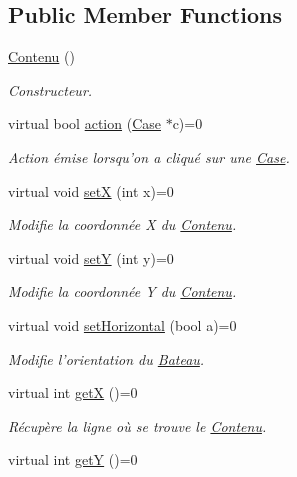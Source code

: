 \subsection*{Public Member Functions}
\begin{DoxyCompactItemize}
\item 
\hyperlink{classContenu_ac20817eae49d031383e9a3be58c2bf15}{Contenu} ()
\begin{DoxyCompactList}\small\item\em Constructeur. \end{DoxyCompactList}\item 
virtual bool \hyperlink{classContenu_ae54145207bfdae5a24ce2c8c523c74a0}{action} (\hyperlink{classCase}{Case} $\ast$c)=0
\begin{DoxyCompactList}\small\item\em Action émise lorsqu'on a cliqué sur une \hyperlink{classCase}{Case}. \end{DoxyCompactList}\item 
virtual void \hyperlink{classContenu_a801fc9cb327750d2889ab3e7b185c029}{set\+X} (int x)=0
\begin{DoxyCompactList}\small\item\em Modifie la coordonnée X du \hyperlink{classContenu}{Contenu}. \end{DoxyCompactList}\item 
virtual void \hyperlink{classContenu_afc6fc6f669313fe77ca57559475d1750}{set\+Y} (int y)=0
\begin{DoxyCompactList}\small\item\em Modifie la coordonnée Y du \hyperlink{classContenu}{Contenu}. \end{DoxyCompactList}\item 
virtual void \hyperlink{classContenu_ad06f3204769fdc758a5859fbb7cac637}{set\+Horizontal} (bool a)=0
\begin{DoxyCompactList}\small\item\em Modifie l'orientation du \hyperlink{classBateau}{Bateau}. \end{DoxyCompactList}\item 
virtual int \hyperlink{classContenu_afce83627ee635c60edb0edced8191af4}{get\+X} ()=0
\begin{DoxyCompactList}\small\item\em Récupère la ligne où se trouve le \hyperlink{classContenu}{Contenu}. \end{DoxyCompactList}\item 
virtual int \hyperlink{classContenu_a1087d1609ec4842bb3d2a5dd960359b6}{get\+Y} ()=0

\end{DoxyCompactItemize}
